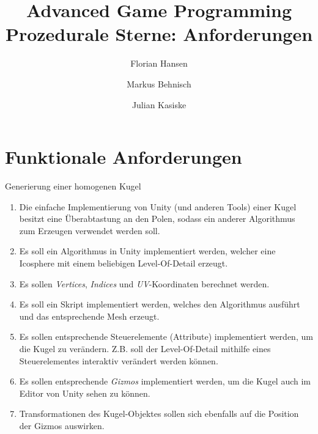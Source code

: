 \documentclass{article}
\title{
  \Huge Advanced Game Programming \\
  \vspace{0.4cm}
  \large Prozedurale Sterne: Anforderungen
}
\author{
  Florian Hansen \and
  Markus Behnisch \and
  Julian Kasiske
}
\begin{document}
  \maketitle

  \section{Funktionale Anforderungen}
  \begin{enumerate}

    \vspace{0.5cm}

    {\bfseries\large\item Generierung einer homogenen Kugel}
    \begin{enumerate}
      \item Die einfache Implementierung von Unity (und anderen Tools) einer
        Kugel besitzt eine Überabtastung an den Polen, sodass ein anderer
        Algorithmus zum Erzeugen verwendet werden soll.
      \item Es soll ein Algorithmus in Unity implementiert werden, welcher eine
        Icosphere mit einem beliebigen Level-Of-Detail erzeugt.
      \item Es sollen \textit{Vertices}, \textit{Indices} und
        \textit{UV}-Koordinaten berechnet werden.
      \item Es soll ein Skript implementiert werden, welches den Algorithmus
        ausführt und das entsprechende Mesh erzeugt.
      \item Es sollen entsprechende Steuerelemente (Attribute) implementiert
        werden, um die Kugel zu verändern. Z.B. soll der Level-Of-Detail
        mithilfe eines Steuerelementes interaktiv verändert werden können.
      \item Es sollen entsprechende \textit{Gizmos} implementiert werden, um die
        Kugel auch im Editor von Unity sehen zu können.
      \item Transformationen des Kugel-Objektes sollen sich ebenfalls auf die
        Position der Gizmos auswirken.
    \end{enumerate}

    \vspace{0.5cm}


\end{enumerate}
\end{document}

